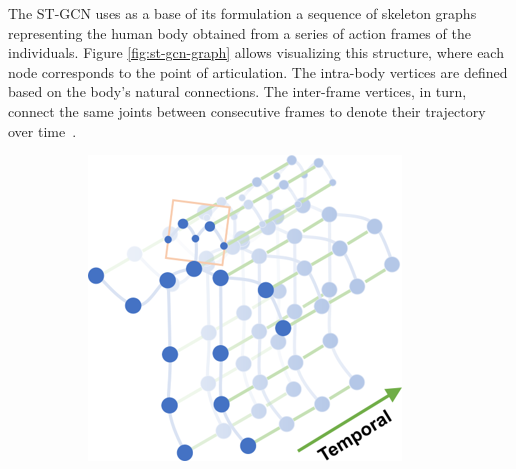 The ST-GCN uses as a base of its formulation a sequence of skeleton graphs representing the human body obtained from a series of action frames of the individuals. Figure \ref{fig:st-gcn-graph} allows visualizing this structure, where each node corresponds to the point of articulation. The intra-body vertices are defined based on the body's natural connections. The inter-frame vertices, in turn, connect the same joints between consecutive frames to denote their trajectory over time~\cite{st-gcn-2018}.
    
    
    
    
\begin{figure}
    \centering
    \begin{subfigure}{.30\textwidth}
      \centering
      \includegraphics[width=.8\linewidth]{images/st_gcn_graph}
      \label{fig:sub1}
    \end{subfigure}%
    \begin{subfigure}{.30\textwidth}
      \centering

\end{subfigure}
\end{figure}
